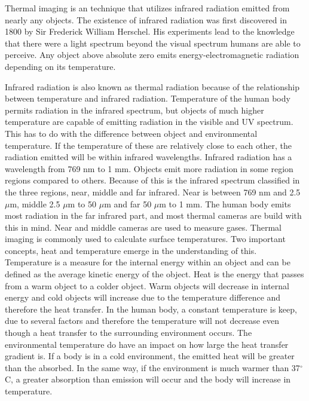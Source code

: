 

Thermal imaging is an technique that utilizes infrared radiation emitted from nearly any objects. 
The existence of infrared radiation was first discovered in 1800 by Sir Frederick William Herschel. 
His experiments lead to the knowledge that there were a light spectrum beyond the visual spectrum humans are able to perceive. Any object above absolute zero emits energy-electromagnetic radiation depending on its temperature.\cite{ignacio2017,optris2009}

Infrared radiation is also known as thermal radiation because of the relationship between temperature and infrared radiation. Temperature of the human body permits radiation in the infrared spectrum, but objects of much higher temperature are capable of emitting radiation in the visible and UV spectrum. This has to do with the difference between object and environmental temperature. If the temperature of these are relatively close to each other, the radiation emitted will be within infrared wavelengths. Infrared radiation has a wavelength from 769 nm to 1 mm. Objects emit more radiation in some region regions compared to others. Because of this is the infrared spectrum classified in the three regions, near, middle and far infrared. Near is between 769 nm and 2.5 $\mu$m, middle 2.5 $\mu$m to 50 $\mu$m and far 50 $\mu$m to 1 mm. The human body emits most radiation in the far infrared part, and most thermal cameras are build with this in mind. Near and middle cameras are used to measure gases.\cite{ignacio2017}
Thermal imaging is commonly used to calculate surface temperatures. Two important concepts, heat and temperature emerge in the understanding of this. Temperature is a measure for the internal energy within an object and can be defined as the average kinetic energy of the object.
Heat is the energy that passes from a warm object to a colder object. Warm objects will decrease in internal energy and cold objects will increase due to the temperature difference and therefore the heat transfer. In the human body, a constant temperature is keep, due to several factors and therefore the temperature will not decrease even though a heat transfer to the surrounding environment occurs. The environmental temperature do have an impact on how large the heat transfer gradient is. If a body is in a cold environment, the emitted heat will be greater than the absorbed. In the same way, if the environment is much warmer than 37$^{\circ}$C, a greater absorption than emission will occur and the body will increase in temperature.\cite{ignacio2017} 

